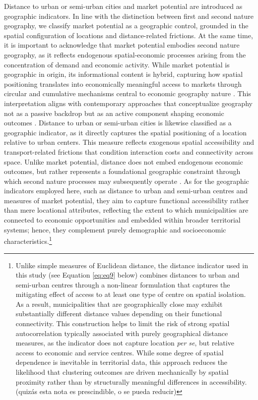 \documentclass[a4paper,11pt,oneside]{article}
\begin{document}
Distance to urban or semi-urban cities and market potential are introduced as geographic indicators. In line with the distinction between first and second nature geography, we classify market potential as a geographic control, grounded in the spatial configuration of locations and distance-related frictions. At the same time, it is important to acknowledge that market potential embodies second nature geography, as it reflects endogenous spatial-economic processes arising from the concentration of demand and economic activity. While market potential is geographic in origin, its informational content is hybrid, capturing how spatial positioning translates into economically meaningful access to markets through circular and cumulative mechanisms central to economic geography nature \citep{bathelt2024nature}. This interpretation aligns with contemporary approaches that conceptualize geography not as a passive backdrop but as an active component shaping economic outcomes \citep{de2024journal}. Distance to urban or semi-urban cities is likewise classified as a geographic indicator, as it directly captures the spatial positioning of a location relative to urban centers. This measure reflects exogenous spatial accessibility and transport-related frictions that condition interaction costs and connectivity across space. Unlike market potential, distance does not embed endogenous economic outcomes, but rather represents a foundational geographic constraint through which second nature processes may subsequently operate \citep{jessen2024role}. As for the geographic indicators employed here, such as distance to urban and semi-urban centres and measures of market potential, they aim to capture functional accessibility rather than mere locational attributes, reflecting the extent to which municipalities are connected to economic opportunities and embedded within broader territorial systems; hence, they complement purely demographic and socioeconomic characteristics.\footnote{Unlike simple measures of Euclidean distance, the distance indicator used in this study (see Equation \eqref{eq:eq9} below) combines distances to urban and semi-urban centres through a non-linear formulation that captures the mitigating effect of access to at least one type of centre on spatial isolation. As a result, municipalities that are geographically close may exhibit substantially different distance values depending on their functional connectivity. This construction helps to limit the risk of strong spatial autocorrelation typically associated with purely geographical distance measures, as the indicator does not capture location \textsl{per se}, but relative access to economic and service centres. While some degree of spatial dependence is inevitable in territorial data, this approach reduces the likelihood that clustering outcomes are driven mechanically by spatial proximity rather than by structurally meaningful differences in accessibility. {\color{red} (quizás esta nota es prescindible, o se pueda reducir)}}
\end{document}
